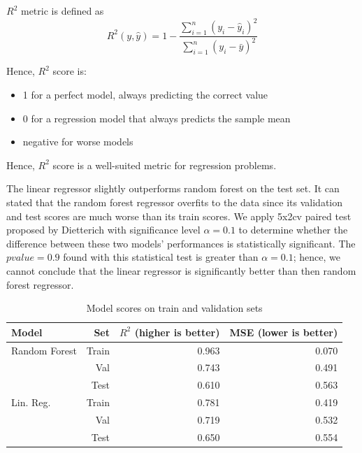 \documentclass[conference]{IEEEtran}
\begin{document}
$R^2$ metric is defined as 
\begin{equation}
    R^2(y, \hat{y}) = 1 - \frac{\sum_{i=1}^{n} (y_i - \hat{y}_i)^2}{\sum_{i=1}^{n} (y_i - \bar{y})^2} \label{eq:r2}
\end{equation}

Hence, $R^2$ score is:
\begin{itemize}
    \item 1 for a perfect model, always predicting the correct value
    \item 0 for a regression model that always predicts the sample mean
    \item negative for worse models
\end{itemize}
Hence, $R^2$ score is a well-suited metric for regression problems. 

The linear regressor slightly outperforms random forest on the test set. 
It can stated that the random forest regressor overfits to the data since its 
validation and test scores are much worse than its train scores. We apply
5x2cv paired test proposed by Dietterich \cite{Dietterich1998} with significance level $\alpha=0.1$ 
to determine whether the difference between these two models' performances is statistically 
significant. The $pvalue=0.9$ found with this statistical test is greater than $\alpha=0.1$; 
hence, we cannot conclude that the linear regressor is significantly better than 
then random forest regressor.

\begin{table}[htbp]
    \caption{Model scores on train and validation sets}
\begin{center}
\begin{tabular}{lrrr}
    \hline
    {Model} & Set &  $R^2$ (higher is better) &  MSE (lower is better) \\
    \hline
    Random Forest    & Train      & 0.963 & 0.070 \\
                     & Val & 0.743 & 0.491 \\
                     & Test       & 0.610 & 0.563 \\
    Lin. Reg.        & Train      & 0.781 & 0.419 \\
                     & Val & 0.719 & 0.532 \\
                     & Test       & 0.650 & 0.554 \\
    \hline
\end{tabular}
\label{table:model-scores}
\end{center}
\end{table}
\end{document}
